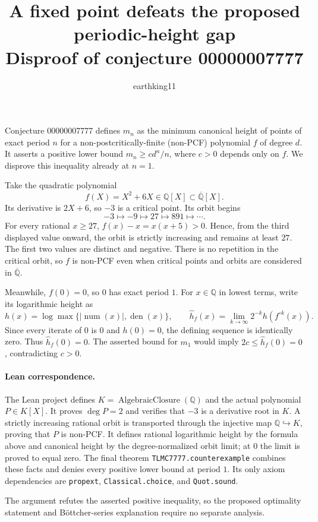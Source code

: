 \documentclass[11pt]{article}
\title{A fixed point defeats the proposed periodic-height gap\\
  Disproof of conjecture 00000007777}
\author{earthking11}
\date{}
\begin{document}
\maketitle

Conjecture 00000007777 defines $m_n$ as the minimum canonical height of
points of exact period $n$ for a non-postcritically-finite (non-PCF)
polynomial $f$ of degree $d$. It asserts a positive lower bound
$m_n\ge c d^n/n$, where $c>0$ depends only on $f$. We disprove this
inequality already at $n=1$.

Take the quadratic polynomial
\[
  f(X)=X^2+6X\in\mathbb Q[X]\subset\overline{\mathbb Q}[X].
\]
Its derivative is $2X+6$, so $-3$ is a critical point. Its orbit begins
\[
  -3\longmapsto -9\longmapsto 27\longmapsto 891\longmapsto\cdots.
\]
For every rational $x\ge27$, $f(x)-x=x(x+5)>0$. Hence, from the third
displayed value onward, the orbit is strictly increasing and remains at
least $27$. The first two values are distinct and negative. There is no
repetition in the critical orbit, so $f$ is non-PCF even when critical
points and orbits are considered in $\overline{\mathbb Q}$.

Meanwhile, $f(0)=0$, so $0$ has exact period $1$. For $x\in\mathbb Q$ in
lowest terms, write its logarithmic height as
\[
  h(x)=\log\max\{|\operatorname{num}(x)|,\operatorname{den}(x)\},\qquad
  \widehat h_f(x)=\lim_{k\to\infty}2^{-k}h(f^{\circ k}(x)).
\]
Since every iterate of $0$ is $0$ and $h(0)=0$, the defining sequence is
identically zero. Thus $\widehat h_f(0)=0$. The asserted bound for
$m_1$ would imply $2c\le\widehat h_f(0)=0$, contradicting $c>0$.

\paragraph{Lean correspondence.}
The Lean project defines $K=\operatorname{AlgebraicClosure}(\mathbb Q)$ and
the actual polynomial $P\in K[X]$. It proves $\deg P=2$ and verifies that
$-3$ is a derivative root in $K$. A strictly increasing rational orbit is
transported through the injective map $\mathbb Q\hookrightarrow K$, proving
that $P$ is non-PCF. It defines rational logarithmic height by the formula
above and canonical height by the degree-normalized orbit limit; at $0$ the
limit is proved to equal zero. The final theorem
\texttt{TLMC7777.counterexample} combines these facts and denies every
positive lower bound at period $1$. Its only axiom dependencies are
\texttt{propext}, \texttt{Classical.choice}, and \texttt{Quot.sound}.

The argument refutes the asserted positive inequality, so the proposed
optimality statement and B\"ottcher-series explanation require no
separate analysis.
\end{document}
